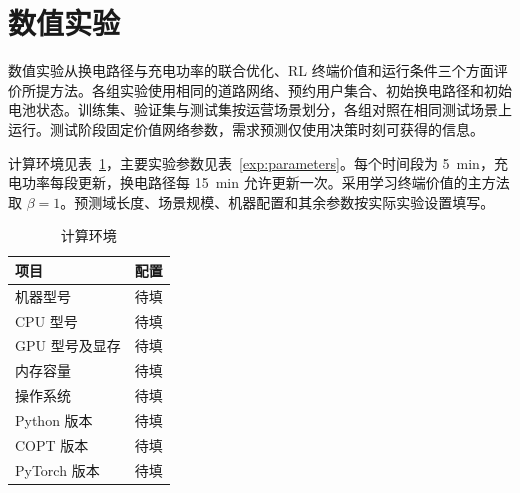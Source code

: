 \section{数值实验}
\label{exp:section}

数值实验从换电路径与充电功率的联合优化、RL 终端价值和运行条件三个方面评价所提方法。各组实验使用相同的道路网络、预约用户集合、初始换电路径和初始电池状态。训练集、验证集与测试集按运营场景划分，各组对照在相同测试场景上运行。测试阶段固定价值网络参数，需求预测仅使用决策时刻可获得的信息。

计算环境见表~\ref{exp:environment}，主要实验参数见表~\ref{exp:parameters}。每个时间段为 5~min，充电功率每段更新，换电路径每 15~min 允许更新一次。采用学习终端价值的主方法取 $\beta=1$。预测域长度、场景规模、机器配置和其余参数按实际实验设置填写。

\begin{table}[!htbp]
  \centering
  \caption{计算环境}
  \label{exp:environment}
  \small
  \begin{tabularx}{0.88\linewidth}{@{}lX@{}}
    \toprule
    项目 & 配置 \\
    \midrule
    机器型号 & 待填 \\
    CPU 型号 & 待填 \\
    GPU 型号及显存 & 待填 \\
    内存容量 & 待填 \\
    操作系统 & 待填 \\
    Python 版本 & 待填 \\
    COPT 版本 & 待填 \\
    PyTorch 版本 & 待填 \\
    \bottomrule
  \end{tabularx}
\end{table}


